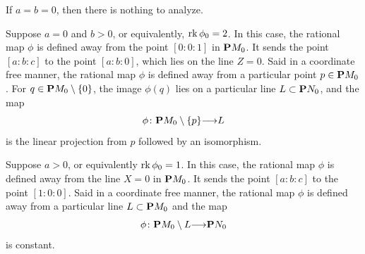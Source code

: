 \documentclass[12pt,reqno]{amsart}
\renewcommand{\to}{{\longrightarrow}}
\numberwithin{equation}{section}
\begin{document}
If $a = b = 0$, then there is nothing to analyze.

Suppose $a = 0$ and $b > 0$, or equivalently, $\rk \phi_0 = 2$.
In this case, the rational map $\phi$ is defined away from the point $[0:0:1]$ in $\P M_0$.
It sends the point $[a:b:c]$ to the point $[a:b:0]$, which lies on the line $Z = 0$.
Said in a coordinate free manner, the rational map $\phi$ is defined away from a particular point $p \in \P M_0$.
For $q \in \P M_0 \setminus \{0\}$, the image $\phi(q)$ lies on a particular line $L \subset \P N_0$, and the map
\begin{equation}\label{eqn:rk2}
  \phi \colon \P M_0 \setminus \{p\} \to L
\end{equation}
is the linear projection from $p$ followed by an isomorphism.

Suppose $a > 0$, or equivalently $\rk \phi_0 = 1$.
In this case, the rational map $\phi$ is defined away from the line $X = 0$ in $\P M_0$.
It sends the point $[a:b:c]$ to the point $[1:0:0]$.
Said in a coordinate free manner, the rational map $\phi$ is defined away from a particular line $L \subset \P M_0$ and the map
\begin{equation}\label{eqn:rk1}
  \phi \colon \P M_0 \setminus L \to \P N_0
\end{equation}
is constant.
\end{document}
